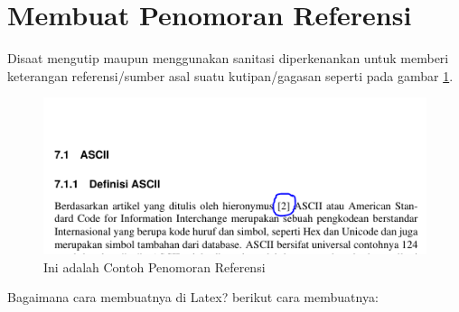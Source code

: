 \section{Membuat Penomoran Referensi}
Disaat mengutip maupun menggunakan sanitasi diperkenankan untuk memberi keterangan referensi/sumber asal suatu kutipan/gagasan seperti pada gambar \ref{fig:contohpenomoranref}.
\begin{figure}[!htbp]
  \centering
  \includegraphics[width=.75\textwidth]{figures/contohpenomoranref.png}
  \caption{Ini adalah Contoh Penomoran Referensi}\label{fig:contohpenomoranref}
\end{figure}
\par Bagaimana cara membuatnya di Latex? berikut cara membuatnya:
